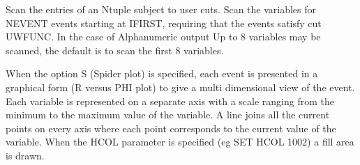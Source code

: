 \ENDCMD


\BEGARG
{}
\ENDARG
{}
\DEFOPT{\EMPTY}{}
\ENDOPT

   \par
Scan the entries of an Ntuple subject to user cuts.  Scan the variables for 
   NEVENT events starting at IFIRST, requiring that the events satisfy cut 
   UWFUNC. In the case of Alphanumeric output Up to 8 variables may be 
   scanned, the default is to scan the first 8 variables.  

   \par
When the option S (Spider plot) is specified, each event is presented in a 
   graphical form (R versus PHI plot) to give a multi dimensional view of the 
   event. Each variable is represented on a separate axis with a scale ranging 
   from the minimum to the maximum value of the variable. A line joins all the 
   current points on every axis where each point corresponds to the current 
   value of the variable. When the HCOL parameter is specified (eg SET HCOL 
   1002) a fill area is drawn.  

